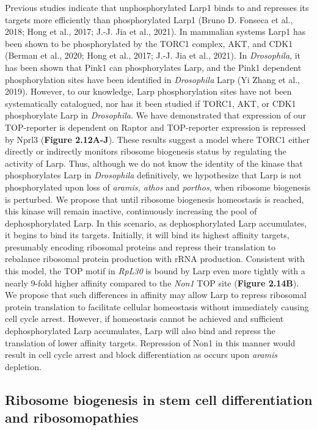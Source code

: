\documentclass[12pt,oneside]{reedthesis}
\begin{document}
Previous studies indicate that unphosphorylated Larp1 binds to and represses its targets more efficiently than phosphorylated Larp1 (Bruno D. Fonseca et al., 2018; Hong et al., 2017; J.-J. Jia et al., 2021). In mammalian systems Larp1 has been shown to be phosphorylated by the TORC1 complex, AKT, and CDK1 (Berman et al., 2020; Hong et al., 2017; J.-J. Jia et al., 2021). In \emph{Drosophila}, it has been shown that Pink1 can phosphorylates Larp, and the Pink1 dependent phosphorylation sites have been identified in \emph{Drosophila} Larp (Yi Zhang et al., 2019). However, to our knowledge, Larp phosphorylation sites have not been systematically catalogued, nor has it been studied if TORC1, AKT, or CDK1 phosphorylate Larp in \emph{Drosophila}. We have demonstrated that expression of our TOP-reporter is dependent on Raptor and TOP-reporter expression is repressed by Nprl3 (\textbf{Figure 2.12A-J}). These results suggest a model where TORC1 either directly or indirectly monitors ribosome biogenesis status by regulating the activity of Larp. Thus, although we do not know the identity of the kinase that phosphorylates Larp in \emph{Drosophila} definitively, we hypothesize that Larp is not phosphorylated upon loss of \emph{aramis, athos} and \emph{porthos}, when ribosome biogenesis is perturbed. We propose that until ribosome biogenesis homeostasis is reached, this kinase will remain inactive, continuously increasing the pool of dephosphorylated Larp. In this scenario, as dephosphorylated Larp accumulates, it begins to bind its targets. Initially, it will bind its highest affinity targets, presumably encoding ribosomal proteins and repress their translation to rebalance ribosomal protein production with rRNA production. Consistent with this model, the TOP motif in \emph{RpL30} is bound by Larp even more tightly with a nearly 9-fold higher affinity compared to the \emph{Non1} TOP site (\textbf{Figure 2.14B}). We propose that such differences in affinity may allow Larp to repress ribosomal protein translation to facilitate cellular homeostasis without immediately causing cell cycle arrest. However, if homeostasis cannot be achieved and sufficient dephosphorylated Larp accumulates, Larp will also bind and repress the translation of lower affinity targets. Repression of Non1 in this manner would result in cell cycle arrest and block differentiation as occurs upon \emph{aramis} depletion.

\hypertarget{ribosome-biogenesis-in-stem-cell-differentiation-and-ribosomopathies}{%
\subsection{Ribosome biogenesis in stem cell differentiation and ribosomopathies}\label{ribosome-biogenesis-in-stem-cell-differentiation-and-ribosomopathies}}
\end{document}
